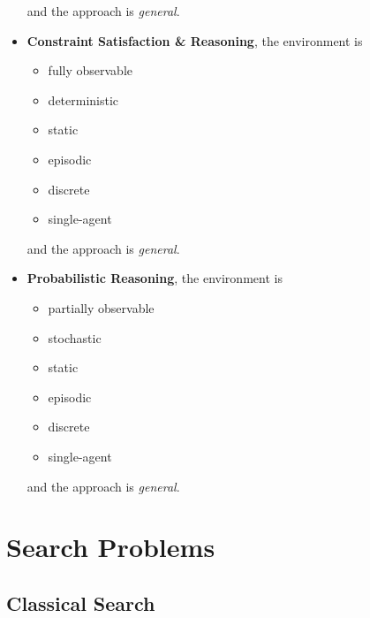 \documentclass[10pt, letterpaper]{report}
\begin{document}
\begin{itemize}
\begin{itemize}
    \end{itemize}
    and the approach is \textit{general}.
    \item \textbf{Constraint Satisfaction \& Reasoning}, the environment is\begin{itemize}
        \item fully observable
        \item deterministic
        \item static 
        \item episodic    
        \item discrete
        \item single-agent
    \end{itemize}
    and the approach is \textit{general}.
    \item \textbf{Probabilistic Reasoning}, the environment is\begin{itemize}
        \item partially observable
        \item stochastic
        \item static 
        \item episodic    
        \item discrete
        \item single-agent
    \end{itemize}
    and the approach is \textit{general}.
\end{itemize}
\chapter{Search Problems}
\section{Classical Search}
\end{document}
